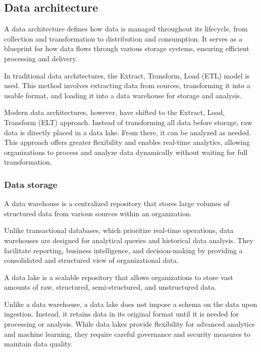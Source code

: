 \subsection{Data architecture}
A data architecture defines how data is managed throughout its lifecycle, from collection and transformation to distribution and consumption. 
It serves as a blueprint for how data flows through various storage systems, ensuring efficient processing and delivery.

In traditional data architectures, the Extract, Transform, Load (ETL) model is used. 
This method involves extracting data from sources, transforming it into a usable format, and loading it into a data warehouse for storage and analysis.

Modern data architectures, however, have shifted to the Extract, Load, Transform (ELT) approach. 
Instead of transforming all data before storage, raw data is directly placed in a data lake. From there, it can be analyzed as needed.
This approach offers greater flexibility and enables real-time analytics, allowing organizations to process and analyze data dynamically without waiting for full transformation.

\subsubsection{Data storage}
\begin{definition}
    A data warehouse is a centralized repository that stores large volumes of structured data from various sources within an organization.
\end{definition}
\noindent Unlike transactional databases, which prioritize real-time operations, data warehouses are designed for analytical queries and historical data analysis. 
They facilitate reporting, business intelligence, and decision-making by providing a consolidated and structured view of organizational data.
\begin{definition}
    A data lake is a scalable repository that allows organizations to store vast amounts of raw, structured, semi-structured, and unstructured data.
\end{definition}
\noindent Unlike a data warehouse, a data lake does not impose a schema on the data upon ingestion. 
Instead, it retains data in its original format until it is needed for processing or analysis.
While data lakes provide flexibility for advanced analytics and machine learning, they require careful governance and security measures to maintain data quality.

